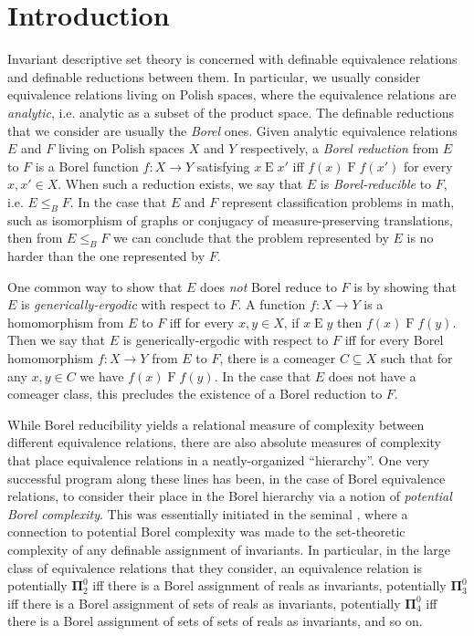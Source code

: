 \documentclass[12pt]{amsart}
\theoremstyle{plain}
\theoremstyle{definition}
\newcommand{\BPi}{\mathbf{\Pi}}
\begin{document}
\section{Introduction}
Invariant descriptive set theory is concerned with definable equivalence relations and definable reductions between them.
In particular, we usually consider equivalence relations living on Polish spaces, where the equivalence relations are \emph{analytic}, i.e. analytic as a subset of the product space.
The definable reductions that we consider are usually the \emph{Borel} ones.
Given analytic equivalence relations $E$ and $F$ living on Polish spaces $X$ and $Y$ respectively, a \emph{Borel reduction} from $E$ to $F$ is a Borel function $f : X \rightarrow Y$ satisfying $x \mathrel{E} x'$ iff $f(x) \mathrel{F} f(x')$ for every $x, x' \in X$.
When such a reduction exists, we say that $E$ is \emph{Borel-reducible} to $F$, i.e. $E \le_B F$.
In the case that $E$ and $F$ represent classification problems in math, such as isomorphism of graphs or conjugacy of measure-preserving translations, then from $E \le_B F$ we can conclude that the problem represented by $E$ is no harder than the one represented by $F$.

One common way to show that $E$ does \emph{not} Borel reduce to $F$ is by showing that $E$ is \emph{generically-ergodic} with respect to $F$.
A function $f : X \rightarrow Y$ is a homomorphism from $E$ to $F$ iff for every $x, y \in X$, if $x \mathrel{E} y$ then $f(x) \mathrel{F} f(y)$.
Then we say that $E$ is generically-ergodic with respect to $F$ iff for every Borel homomorphism $f : X \rightarrow Y$ from $E$ to $F$, there is a comeager $C \subseteq X$ such that for any $x, y \in C$ we have $f(x) \mathrel{F} f(y)$.
In the case that $E$ does not have a comeager class, this precludes the existence of a Borel reduction to $F$.

While Borel reducibility yields a relational measure of complexity between different equivalence relations, there are also absolute measures of complexity that place equivalence relations in a neatly-organized ``hierarchy''.
One very successful program along these lines has been, in the case of Borel equivalence relations, to consider their place in the Borel hierarchy via a notion of \emph{potential Borel complexity}.
This was essentially initiated in the seminal \cite{HKL1998}, where a connection to potential Borel complexity was made to the set-theoretic complexity of any definable assignment of invariants.
In particular, in the large class of equivalence relations that they consider, an equivalence relation is potentially $\BPi^0_2$ iff there is a Borel assignment of reals as invariants, potentially $\BPi^0_3$ iff there is a Borel assignment of sets of reals as invariants, potentially $\BPi^0_4$ iff there is a Borel assignment of sets of sets of reals as invariants, and so on.
\end{document}

